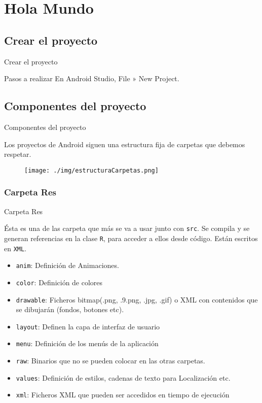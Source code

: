 \section{Hola Mundo}

\subsection{Crear el proyecto}

\begin{frame}{Crear el proyecto}
\begin{block}{Pasos a realizar}
En Android Studio, File » New Project.
\end{block}
\end{frame}

\subsection{Componentes del proyecto}

\begin{frame}{Componentes del proyecto}
\begin{block}{}
Los proyectos de Android siguen una estructura fija de carpetas que debemos respetar.
\begin{figure}[H]
\centering
\texttt{[image: ./img/estructuraCarpetas.png]}
\end{figure}
\end{block}
\end{frame}

\subsubsection{Carpeta Res}

\begin{frame}{Carpeta Res}
\begin{block}{}
Ésta es una de las carpeta que más se va a usar junto con \texttt{src}. Se compila y se generan referencias en la clase \texttt{R}, para acceder a ellos desde código. Están escritos en \texttt{XML}.
\pause
\end{block}
\begin{itemize}
    \item<2-> \texttt{anim}: Definición de Animaciones.
    \item<3-> \texttt{color}: Definición de colores
    \item<4-> \texttt{drawable}: Ficheros bitmap(.png, .9.png, .jpg, .gif) o XML con contenidos que se dibujarán (fondos, botones etc).
    \item<5-> \texttt{layout}: Definen la capa de interfaz de usuario
    \item<6-> \texttt{menu}: Definición de los menús de la aplicación
    \item<7-> \texttt{raw}: Binarios que no se pueden colocar en las otras carpetas.
    \item<8-> \texttt{values}: Definición de estilos, cadenas de texto para Localización etc.
    \item<9-> \texttt{xml}: Ficheros XML que pueden ser accedidos en tiempo de ejecución
\end{itemize}
\end{frame}

